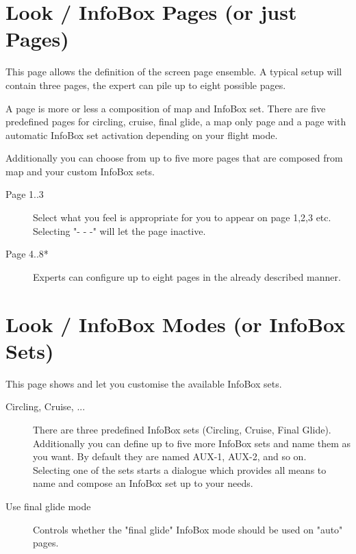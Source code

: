 \section{Look / InfoBox Pages (or just Pages)}\label{conf:screenpages}

This page allows the definition of the screen page ensemble. A typical setup 
will contain three pages, the expert can pile up to eight possible pages.

A page is more or less a composition of map and InfoBox set. There are five 
predefined pages for circling, cruise, final glide, a map only page and a 
page with automatic InfoBox set activation depending on your flight mode.

Additionally you can choose from up to five more pages that are composed from map 
and your custom InfoBox sets.  

\begin{description}
\item[Page 1..3]  Select what you feel is appropriate for you to appear on page 1,2,3 etc. 
  Selecting "- - -" will let the page inactive.
\item[Page 4..8*]  Experts can configure up to eight pages in the already 
  described manner.
\end{description}


\section{Look / InfoBox Modes (or InfoBox Sets)}\label{sec:infobox_sets}
\label{conf:infobox_sets}

This page shows and let you customise the available InfoBox sets.

\begin{description}
\item[Circling, Cruise, ...]  There are three predefined InfoBox sets (Circling, Cruise, Final Glide). 
  Additionally you can define up to five more InfoBox sets and name them as you want.   
  By default they are named AUX-1, AUX-2, and so on. \\
  Selecting one of the sets starts a dialogue which provides all means to name and 
  compose an InfoBox set up to your needs.

\item[Use final glide mode]  Controls whether the "final glide" InfoBox mode should be used on "auto" pages.
\end{description}

